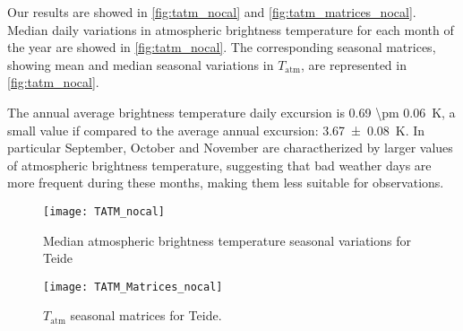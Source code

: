Our results are showed in \autoref{fig:tatm_nocal} and
\autoref{fig:tatm_matrices_nocal}. Median daily variations in atmospheric
brightness temperature for each month of the year are showed in
\autoref{fig:tatm_nocal}. The corresponding seasonal matrices, showing mean
and median seasonal variations in $T_\text{atm}$, are represented in
\autoref{fig:tatm_nocal}.

The annual average brightness temperature daily excursion is \SI{0.69 \pm
0.06}{\kelvin}, a small value if compared to the average annual
excursion: \SI{3.67 \pm 0.08}{\kelvin}. In particular
September, October and November are charactherized by larger values of
atmospheric brightness temperature, suggesting that bad weather days are more
frequent during these months, making them less suitable for observations.

\begin{figure}
        \centering
        \texttt{[image: TATM\_nocal]}
        \caption{Median atmospheric brightness temperature seasonal variations for
        Teide}
        \label{fig:tatm_nocal}
\end{figure}

\begin{figure}
        \centering
        \texttt{[image: TATM\_Matrices\_nocal]}
        \caption{$T_\text{atm}$ seasonal matrices for Teide.}
        \label{fig:tatm_matrices_nocal}
\end{figure}

